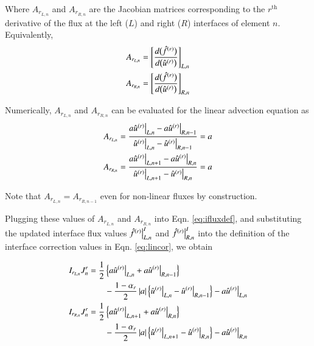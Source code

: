 Where $A_{r_{L,n}}$ and $A_{r_{R,n}}$ are the Jacobian matrices corresponding to the
$r^{\text{th}}$ derivative of the flux at the left ($L$) and right ($R$) interfaces of element $n$.
Equivalently,
\begin{equation}
\begin{split}
 A_{r_{L,n}} &= \l[ \frac{d \big( \hat{f}^{(r)} \big)}{d \big( \hat{u}^{(r)} \big)}
\r]_{L,n}\\
 A_{r_{R,n}} &= \l[ \frac{d \big( \hat{f}^{(r)} \big)}{d \big( \hat{u}^{(r)} \big)}
\r]_{R,n}
\end{split}
\end{equation}

Numerically, $A_{r_{L,n}}$ and $A_{r_{R,n}}$ can be evaluated for the linear advection equation as
\begin{equation}
\begin{split}
 A_{r_{L,n}} &= \frac{a \urdrL[n] - a \urdrR[n-1]}{\urdrL[n] - \urdrR[n-1]} = a\\%
 A_{r_{R,n}} &= \frac{a \urdrL[n+1] - a \urdrR[n]}{\urdrL[n+1] - \urdrR[n]} = a%
\end{split}
\end{equation}


Note that $A_{r_{L,n}} = A_{r_{R,n-1}}$ even for non-linear fluxes by construction.

Plugging these values of $A_{r_{L,n}}$ and $A_{r_{R,n}}$ into Eqn. \eqref{eq:ifluxdef}, and
substituting the updated interface flux values $\dD{\hat{f}}{r} \big|^I_{L,n}$ and $\dD{\hat{f}}{r}
\big|^I_{R,n}$ into the definition of the interface correction values in Eqn. \eqref{eq:lincor},
we obtain

\begin{equation}
\begin{split}
 \IL[r] J_n^r = \frac{1}{2} &\l\{a\urdrL[n] + 
a\urdrR[n-1] \r\}\\
 &- \frac{1-{\alpha_r}}{2} \l|a\r| \l\{\urdrL - \urdrR[n-1] \r\} - a\urdrL\\
 \IR[r] J_n^r = \frac{1}{2} &\l\{a\urdrL[n+1] + 
a\urdrR[n] \r\} \\
&- \frac{1-{\alpha_r}}{2} \l|a\r| \l\{\urdrL[n+1] - \urdrR[n] \r\} - a\urdrR
\end{split}
\end{equation}

